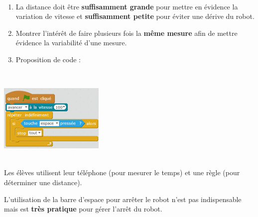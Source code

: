 \begin{minipage}[t]{0.5\linewidth}
    \begin{methode}~\\
     \begin{enumerate}
         \item La distance doit être \textbf{suffisamment grande} pour mettre en évidence la variation de vitesse et \textbf{suffisamment petite} pour éviter une dérive du robot.
        \item Montrer l'intérêt de faire plusieurs fois la \textbf{même mesure} afin de mettre évidence la variabilité d'une mesure.
        \item Proposition de code :
     \end{enumerate}
        ~\\
        \begin{center}
            \includegraphics[width=0.85\linewidth]{res/mbot-vitesse-sol.png}
        \end{center}
    \end{methode}
\end{minipage}
\hfill
\begin{minipage}[t]{0.5\linewidth}
    \begin{remarque}~\\
        Les élèves utilisent leur téléphone (pour mesurer le temps) et une règle (pour déterminer une distance).
        
        L'utilisation de la barre d'espace pour arrêter le robot n'est pas indispensable mais est \textbf{très pratique} pour gérer l'arrêt du robot.
    \end{remarque}
\end{minipage}